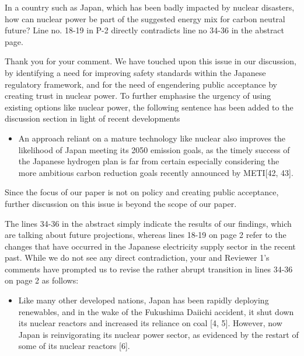 \documentclass[answers,11pt]{exam}
\begin{document}
\begin{questions}
\begin{solution}
                 
        \end{solution}

                        \question In a country such as Japan, which has been badly impacted by nuclear disasters, how can nuclear power be part of the suggested energy mix for carbon neutral future? Line no. 18-19 in P-2 directly contradicts line no 34-36 in the abstract page.
        
        \begin{solution}
        
                 Thank you for your comment. We have touched upon this issue in our discussion, by identifying a need for improving safety standards within the Japanese regulatory framework, and for the need of engendering public acceptance by creating trust in nuclear power. To further emphasise the urgency of using existing options like nuclear power, the following sentence has been added to the discussion section in light of recent developments
                 
                 \begin{itemize}
                 \item An approach reliant on a mature technology like nuclear also improves the likelihood of Japan meeting its 2050 emission goals, as the timely success of the Japanese hydrogen plan is far from certain especially considering the more ambitious carbon reduction goals recently announced by METI[42, 43].
                 \end{itemize}
                 
                  Since the focus of our paper is not on policy and creating public acceptance, further discussion on this issue is beyond the scope of our paper.
                 
                 The lines 34-36 in the abstract simply indicate the results of our findings, which are talking about future projections, whereas lines 18-19 on page 2 refer to the changes that have occurred in the Japanese electricity supply sector in the recent past. While we do not see any direct contradiction, your and Reviewer 1's comments have prompted us to revise the rather abrupt transition in lines 34-36 on page 2 as follows:
                 
                 \begin{itemize}
                 
                  \item  Like many other developed nations, Japan has been rapidly deploying renewables, and in the wake of the Fukushima Daiichi accident, it shut down its nuclear reactors and increased its reliance on coal [4, 5]. However, now Japan is reinvigorating its nuclear power sector, as evidenced by the restart of some of its nuclear reactors [6].
                 

\end{itemize}
\end{solution}
\end{questions}
\end{document}
